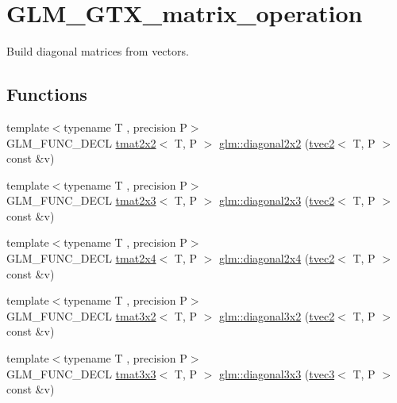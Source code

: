 \hypertarget{group__gtx__matrix__operation}{}\section{G\+L\+M\+\_\+\+G\+T\+X\+\_\+matrix\+\_\+operation}
\label{group__gtx__matrix__operation}


Build diagonal matrices from vectors.  


\subsection*{Functions}
\begin{DoxyCompactItemize}
\item 
{\footnotesize template$<$typename T , precision P$>$ }\\G\+L\+M\+\_\+\+F\+U\+N\+C\+\_\+\+D\+E\+CL \hyperlink{structglm_1_1tmat2x2}{tmat2x2}$<$ T, P $>$ \hyperlink{group__gtx__matrix__operation_ga01dc503262dba9c457113d131fc8c024}{glm\+::diagonal2x2} (\hyperlink{structglm_1_1tvec2}{tvec2}$<$ T, P $>$ const \&v)
\item 
{\footnotesize template$<$typename T , precision P$>$ }\\G\+L\+M\+\_\+\+F\+U\+N\+C\+\_\+\+D\+E\+CL \hyperlink{structglm_1_1tmat2x3}{tmat2x3}$<$ T, P $>$ \hyperlink{group__gtx__matrix__operation_ga763817f07d6a94b722a48adfa87a35db}{glm\+::diagonal2x3} (\hyperlink{structglm_1_1tvec2}{tvec2}$<$ T, P $>$ const \&v)
\item 
{\footnotesize template$<$typename T , precision P$>$ }\\G\+L\+M\+\_\+\+F\+U\+N\+C\+\_\+\+D\+E\+CL \hyperlink{structglm_1_1tmat2x4}{tmat2x4}$<$ T, P $>$ \hyperlink{group__gtx__matrix__operation_ga49b37c819cf6dd8e35112ed1a13d45a3}{glm\+::diagonal2x4} (\hyperlink{structglm_1_1tvec2}{tvec2}$<$ T, P $>$ const \&v)
\item 
{\footnotesize template$<$typename T , precision P$>$ }\\G\+L\+M\+\_\+\+F\+U\+N\+C\+\_\+\+D\+E\+CL \hyperlink{structglm_1_1tmat3x2}{tmat3x2}$<$ T, P $>$ \hyperlink{group__gtx__matrix__operation_ga586e1ced91fd8a7c414186a200f13532}{glm\+::diagonal3x2} (\hyperlink{structglm_1_1tvec2}{tvec2}$<$ T, P $>$ const \&v)
\item 
{\footnotesize template$<$typename T , precision P$>$ }\\G\+L\+M\+\_\+\+F\+U\+N\+C\+\_\+\+D\+E\+CL \hyperlink{structglm_1_1tmat3x3}{tmat3x3}$<$ T, P $>$ \hyperlink{group__gtx__matrix__operation_ga8e817dba22f2305cdebae07bbbe0360c}{glm\+::diagonal3x3} (\hyperlink{structglm_1_1tvec3}{tvec3}$<$ T, P $>$ const \&v)

\end{DoxyCompactItemize}
